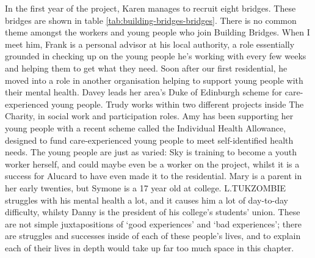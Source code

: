 In the first year of the project, Karen manages to recruit eight bridges. These bridges are shown in table \ref{tab:building-bridges-bridges}. There is no common theme amongst the workers and young people who join Building Bridges. When I meet him, Frank is a personal advisor at his local authority, a role essentially grounded in checking up on the young people he's working with every few weeks and helping them to get what they need. Soon after our first residential, he moved into a role in another organisation helping to support young people with their mental health. Davey leads her area's Duke of Edinburgh scheme for care-experienced young people. Trudy works within two different projects inside The Charity, in social work and participation roles. Amy has been supporting her young people with a recent scheme called the Individual Health Allowance, designed to fund care-experienced young people to meet self-identified health needs. The young people are just as varied: Sky is training to become a youth worker herself, and could maybe even be a worker on the project, whilst it is a success for Alucard to have even made it to the residential. Mary is a parent in her early twenties, but Symone is a 17 year old at college. L.TUKZOMBIE struggles with his mental health a lot, and it causes him a lot of day-to-day difficulty, whilsty Danny is the president of his college's students' union. These are not simple juxtapositions of `good experiences' and `bad experiences'; there are struggles and successes inside of each of these people's lives, and to explain each of their lives in depth would take up far too much space in this chapter. 

